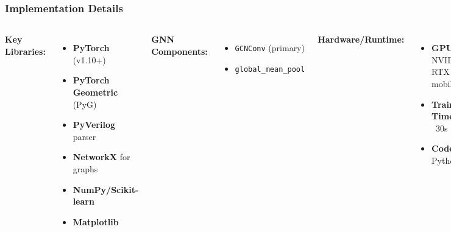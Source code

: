 \documentclass[aspectratio=169]{beamer}
\begin{document}
\begin{frame}
\frametitle{Implementation Details}

\begin{columns}

\textbf{Key Libraries:}
\begin{itemize}
    \item \textbf{PyTorch} (v1.10+)
    \item \textbf{PyTorch Geometric} (PyG)
    \item \textbf{PyVerilog} parser
    \item \textbf{NetworkX} for graphs
    \item \textbf{NumPy/Scikit-learn}
    \item \textbf{Matplotlib}
\end{itemize}

\textbf{GNN Components:}
\begin{itemize}
    \item \texttt{GCNConv} (primary)
    \item \texttt{global\_mean\_pool}
\end{itemize}


\vspace{-0.5em} %
\textbf{Hardware/Runtime:}
\begin{itemize}
    \item \textbf{GPU}: NVIDIA RTX 3060 mobile
    \item \textbf{Training Time}: ~30s
    \item \textbf{Codebase}: Python 3.9
\end{itemize}

\end{columns}

\end{frame}
\end{document}
